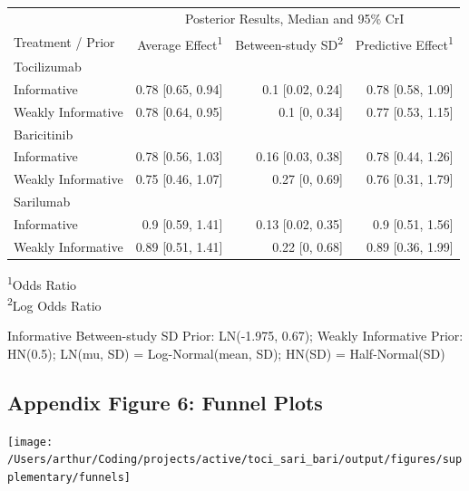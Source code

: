 \documentclass[
  12pt,
]{article}
\begin{document}
\captionsetup[table]{labelformat=empty,skip=1pt}
\begin{longtable}{lrrr}
\toprule
 & \multicolumn{3}{c}{Posterior Results, Median and 95\% CrI} \\ 
 \cmidrule(lr){2-4}
Treatment / Prior & Average Effect\textsuperscript{1} & Between-study SD\textsuperscript{2} & Predictive Effect\textsuperscript{1} \\ 
\midrule
\multicolumn{1}{l}{Tocilizumab} \\ 
\midrule
Informative & 0.78 [0.65, 0.94] & 0.1 [0.02, 0.24] & 0.78 [0.58, 1.09] \\ 
Weakly Informative & 0.78 [0.64, 0.95] & 0.1 [0, 0.34] & 0.77 [0.53, 1.15] \\ 
\midrule
\multicolumn{1}{l}{Baricitinib} \\ 
\midrule
Informative & 0.78 [0.56, 1.03] & 0.16 [0.03, 0.38] & 0.78 [0.44, 1.26] \\ 
Weakly Informative & 0.75 [0.46, 1.07] & 0.27 [0, 0.69] & 0.76 [0.31, 1.79] \\ 
\midrule
\multicolumn{1}{l}{Sarilumab} \\ 
\midrule
Informative & 0.9 [0.59, 1.41] & 0.13 [0.02, 0.35] & 0.9 [0.51, 1.56] \\ 
Weakly Informative & 0.89 [0.51, 1.41] & 0.22 [0, 0.68] & 0.89 [0.36, 1.99] \\ 
 \bottomrule
\end{longtable}
\vspace{-5mm}
\begin{minipage}{\linewidth}
\textsuperscript{1}Odds Ratio \\ 
\textsuperscript{2}Log Odds Ratio \\ 
\end{minipage}
\begin{minipage}{\linewidth}
Informative Between-study SD Prior: LN(-1.975, 0.67); Weakly Informative Prior: HN(0.5); LN(mu, SD) = Log-Normal(mean, SD); HN(SD) = Half-Normal(SD)\\ 
\end{minipage}

\newpage

\hypertarget{appendix-figure-6-funnel-plots}{%
\subsection{Appendix Figure 6: Funnel
Plots}\label{appendix-figure-6-funnel-plots}}

\begin{center}\texttt{[image: /Users/arthur/Coding/projects/active/toci\_sari\_bari/output/figures/supplementary/funnels]} \end{center}
\end{document}
